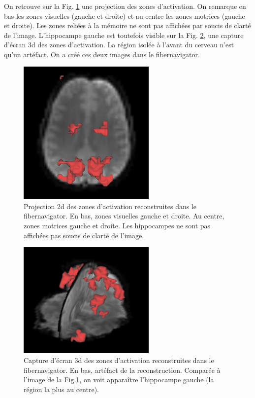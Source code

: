 \documentclass[a4paper]{article}
\begin{document}
On retrouve sur la Fig. \ref{fmri_2d} une projection des zones d'activation. On remarque en bas les zones visuelles (gauche et droite) et au centre les zones motrices (gauche et droite). Les zones reliées à la mémoire ne sont pas affichées par soucis de clarté de l'image. L'hippocampe gauche est toutefois visible sur la Fig. \ref{fmri_3d}, une capture d'écran 3d des zones d'activation. La région isolée à l'avant du cerveau n'est qu'un artéfact. On a créé ces deux images dans le fibernavigator.

\begin{figure}
\begin{center}
\includegraphics[width=0.6\textwidth]{fmri_2d}
\caption{Projection 2d des zones d'activation reconstruites dans le fibernavigator. En bas, zones visuelles gauche et droite. Au centre, zones motrices gauche et droite. Les hippocampes ne sont pas affichées pas soucis de clarté de l'image.
\label{fmri_2d}}
\end{center}
\end{figure}

\begin{figure}
\begin{center}
\includegraphics[width=0.6\textwidth]{fmri_3d}
\caption{Capture d'écran 3d des zones d'activation reconstruites dans le fibernavigator. En bas, artéfact de la reconstruction. Comparée à l'image de la Fig.\ref{fmri_2d}, on voit apparaître l'hippocampe gauche (la région la plus au centre).
\label{fmri_3d}}
\end{center}
\end{figure}
\end{document}
